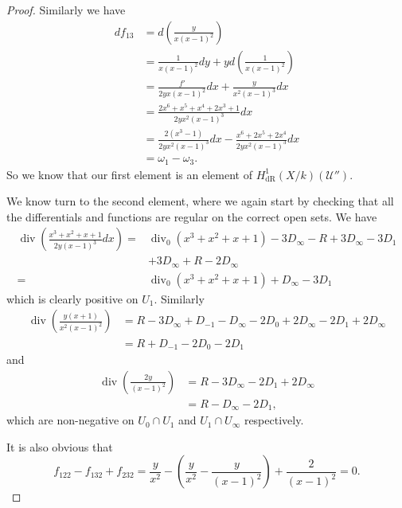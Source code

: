 \documentclass[draft, 11pt]{article} %
\theoremstyle{plain}
\theoremstyle{remark}
\newcommand{\cU}{{\mathcal U}}
\newcommand{\derhamhone}{H_{\text {dR}}^1(X/k)}
\DeclareMathOperator{\di}{div}
\begin{document}
\begin{proof}
Similarly we have
\begin{align}
df_{13} & = d \left( \frac{y}{x(x-1)^2} \right) \\
& = \frac{1}{x(x-1)^2}dy + y d \left( \frac{1}{x(x-1)^2} \right) \\
& = \frac{f'}{2yx(x-1)^2}dx + \frac{y}{x^2(x-1)^3}dx \\
& = \frac{2x^6 + x^5 + x^4 + 2x^3 + 1}{2yx^2(x-1)^3} dx\\
& = \frac{2(x^3-1)}{2yx^2(x-1)^3}dx - \frac{x^6 + 2x^5 + 2x^4}{2yx^2(x-1)^3}dx \\
& = \omega_1 - \omega_3.
\end{align}
So we know that our first element is an element of $\derhamhone (\cU'')$.

We know turn to the second element, where we again start by checking that all the differentials and functions are regular on the correct open sets.
We have
\begin{align}
\di \left( \frac{x^3 + x^2 + x + 1}{2y(x-1)^3} dx \right) = & \di_0(x^3 + x^2 + x + 1) - 3D_\infty - R + 3D_\infty - 3D_1 \\
& + 3D_\infty + R - 2D_\infty \\
 = &  \di_0(x^3 + x^2 + x + 1) + D_\infty - 3D_1
\end{align}
which is clearly positive on $U_1$.
Similarly
\begin{align}
\di \left( \frac{y(x+1)}{x^2(x-1)^2} \right) & = R - 3D_\infty + D_{-1} -D_\infty -2D_0 + 2D_\infty - 2D_1 + 2D_\infty \\
& = R + D_{-1} - 2D_0 - 2D_1
\end{align}
and
\begin{align}
\di \left( \frac{2y}{(x-1)^2} \right) & = R - 3D_\infty - 2D_1 + 2D_\infty \\
& = R - D_\infty - 2D_1,
\end{align}
which are non-negative on $U_0 \cap U_1$ and $U_1 \cap U_\infty$ respectively.

It is also obvious that
\[
f_{122} - f_{132} + f_{232} = \frac{y}{x^2} - \left( \frac{y}{x^2} - \frac{y}{(x-1)^2} \right) + \frac{2}{(x-1)^2} = 0.
\]


\end{proof}
\end{document}
